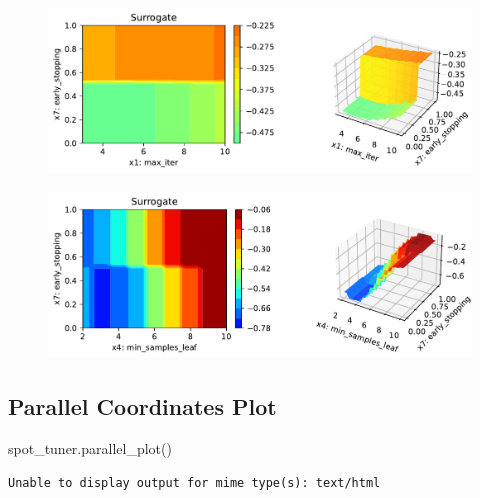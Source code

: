 \documentclass[
  letterpaper,
  DIV=11,
  numbers=noendperiod]{scrreprt}
\newenvironment{Shaded}{\begin{snugshade}}{\end{snugshade}}
\newcommand{\NormalTok}[1]{\textcolor[rgb]{0.00,0.23,0.31}{#1}}
\begin{document}
\begin{figure}[H]

{\centering \includegraphics{17_spot_hpt_sklearn_multiclass_classification_xgb_files/figure-pdf/cell-46-output-6.pdf}

}

\end{figure}

\begin{figure}[H]

{\centering \includegraphics{17_spot_hpt_sklearn_multiclass_classification_xgb_files/figure-pdf/cell-46-output-7.pdf}

}

\end{figure}

\hypertarget{parallel-coordinates-plot-2}{%
\subsection{Parallel Coordinates
Plot}\label{parallel-coordinates-plot-2}}

\begin{Shaded}
\begin{Highlighting}[]
\NormalTok{spot\_tuner.parallel\_plot()}
\end{Highlighting}
\end{Shaded}

\begin{verbatim}
Unable to display output for mime type(s): text/html
\end{verbatim}
\end{document}
